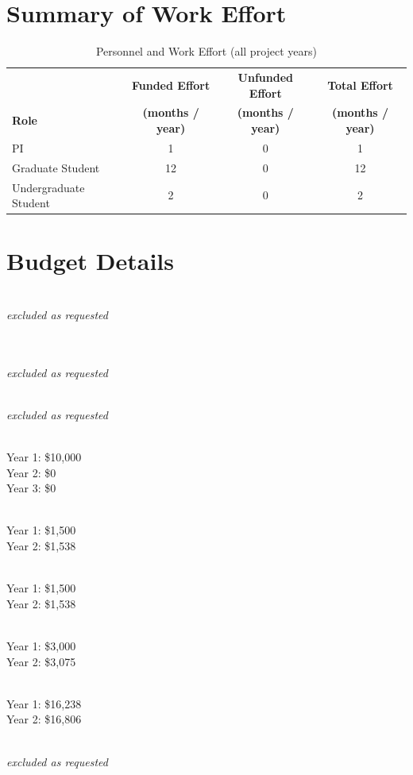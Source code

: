 \documentclass[12pt, preprint]{hacked-aastex}
\begin{document}
\clearpage
\section{Summary of Work Effort}\label{sec:effort}


\begin{table}[h!]
\centering
\caption{Personnel and Work Effort (all project years)\label{table:effort}} 
\begin{tabular}{lccc}
\\
\hline
& {\bf Funded Effort} & {\bf Unfunded Effort} & {\bf Total Effort} \\
{\bf Role} & {\bf (months / year)} & {\bf (months / year)} 
& {\bf (months / year)} \\
\hline
\hline
PI & 1 & 0 & 1 \\
Graduate Student & 12 & 0 & 12 \\
Undergraduate Student & 2 & 0 & 2 \\
\hline
\end{tabular}
\end{table}

\clearpage
\section{Budget Details}
\label{sec:budget-details}

\\
{\it excluded as requested}

\\
\\
{\it excluded as requested}

\\
{\it excluded as requested}

\\
Year 1: \$10,000\\
Year 2: \$0\\
Year 3: \$0

\\
Year 1: \$1,500\\
Year 2: \$1,538

\\
Year 1: \$1,500\\
Year 2: \$1,538

\\
Year 1: \$3,000\\
Year 2: \$3,075

\\
Year 1: \$16,238\\
Year 2: \$16,806

\\
{\it excluded as requested}
\end{document}

